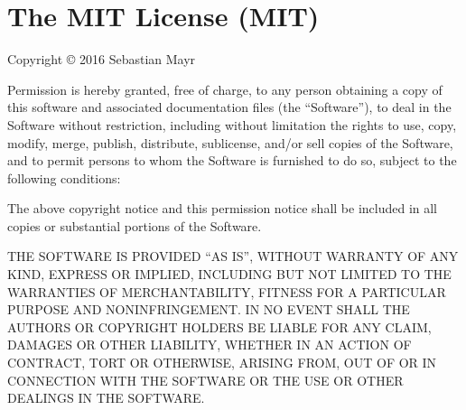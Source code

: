 \chapter{The MIT License (MIT)}
\hypertarget{md_pkiclassroomrescheduler_2src_2main_2frontend_2node__modules_2w3c-xmlserializer_2_l_i_c_e_n_s_e}{}\label{md_pkiclassroomrescheduler_2src_2main_2frontend_2node__modules_2w3c-xmlserializer_2_l_i_c_e_n_s_e}
Copyright © 2016 Sebastian Mayr

Permission is hereby granted, free of charge, to any person obtaining a copy of this software and associated documentation files (the “\+Software”), to deal in the Software without restriction, including without limitation the rights to use, copy, modify, merge, publish, distribute, sublicense, and/or sell copies of the Software, and to permit persons to whom the Software is furnished to do so, subject to the following conditions\+:

The above copyright notice and this permission notice shall be included in all copies or substantial portions of the Software.

THE SOFTWARE IS PROVIDED “\+AS IS”, WITHOUT WARRANTY OF ANY KIND, EXPRESS OR IMPLIED, INCLUDING BUT NOT LIMITED TO THE WARRANTIES OF MERCHANTABILITY, FITNESS FOR A PARTICULAR PURPOSE AND NONINFRINGEMENT. IN NO EVENT SHALL THE AUTHORS OR COPYRIGHT HOLDERS BE LIABLE FOR ANY CLAIM, DAMAGES OR OTHER LIABILITY, WHETHER IN AN ACTION OF CONTRACT, TORT OR OTHERWISE, ARISING FROM, OUT OF OR IN CONNECTION WITH THE SOFTWARE OR THE USE OR OTHER DEALINGS IN THE SOFTWARE. 